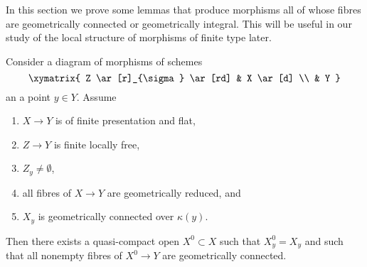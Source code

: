 \noindent
In this section we prove some lemmas that produce morphisms all of
whose fibres are geometrically connected or geometrically integral.
This will be useful in our study of the local structure of morphisms
of finite type later.

\begin{lemma}
\label{lemma-descent-connected-fibres}
Consider a diagram of morphisms of schemes
$$
\xymatrix{
Z \ar[r]_{\sigma} \ar[rd] & X \ar[d] \\
& Y
}
$$
an a point $y \in Y$. Assume
\begin{enumerate}
\item $X \to Y$ is of finite presentation and flat,
\item $Z \to Y$ is finite locally free,
\item $Z_y \not = \emptyset$,
\item all fibres of $X \to Y$ are geometrically reduced, and
\item $X_y$ is geometrically connected over $\kappa(y)$.
\end{enumerate}
Then there exists a quasi-compact open $X^0 \subset X$ such that $X^0_y = X_y$
and such that all nonempty fibres of $X^0 \to Y$ are geometrically connected.
\end{lemma}

